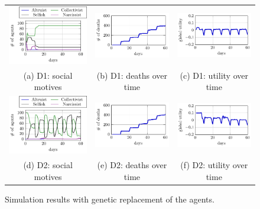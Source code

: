 \begin{figure}[htb]
    \centering
    \begin{tabular}{ccc}
    \includegraphics[width=0.3\linewidth]{008_team_6_agent_design/E/E1_SM.pdf} &   \includegraphics[width=0.3\linewidth]{008_team_6_agent_design/E/E1_deaths.pdf} &
    \includegraphics[width=0.3\linewidth]{008_team_6_agent_design/E/E1_utility.pdf}\\[0pt]
    (a) D1: social motives & (b) D1: deaths over time & (c) D1: utility over time \\[8pt]
         \includegraphics[width=0.3\linewidth]{008_team_6_agent_design/D/D2_SM.pdf} &   \includegraphics[width=0.3\linewidth]{008_team_6_agent_design/D/D2_deaths.pdf} &
    \includegraphics[width=0.3\linewidth]{008_team_6_agent_design/D/D2_utility.pdf}\\[0pt]
    (d) D2: social motives & (e) D2: deaths over time & (f) D2: utility over time 
    \end{tabular}
    \caption{Simulation results with genetic replacement of the agents.}
    \label{fig:res_E}%
\end{figure}
